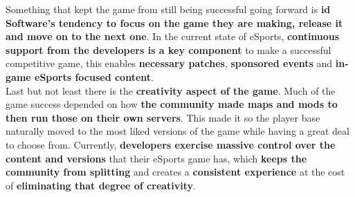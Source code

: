 Something that kept the game from still being successful going forward is \textbf{id Software's tendency to focus on the game they are making, release it and move on to the next one}. In the current state of eSports, \textbf{continuous support from the developers is a key component} to make a successful competitive game, this enables \textbf{necessary patches}, \textbf{sponsored events} and \textbf{in-game eSports focused content}.\\

Last but not least there is the \textbf{creativity aspect of the game}. Much of the game success depended on how \textbf{the community made maps and mods to then run those on their own servers}. This made it so the player base naturally moved to the most liked versions of the game while having a great deal to choose from. Currently, \textbf{developers exercise massive control over the content and versions} that their eSports game has, which\textbf{ keeps the community from splitting} and creates a \textbf{consistent experience} at the cost of \textbf{eliminating that degree of creativity}.

































